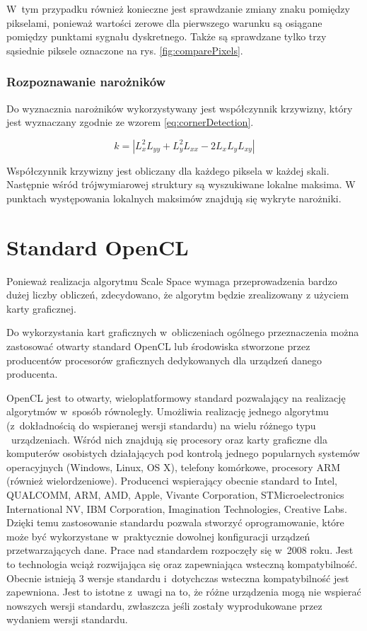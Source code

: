 W~tym przypadku również konieczne jest sprawdzanie zmiany znaku pomiędzy pikselami, ponieważ wartości zerowe dla pierwszego warunku są osiągane pomiędzy punktami sygnału dyskretnego. Także są sprawdzane tylko trzy sąsiednie piksele oznaczone na rys. \ref{fig:comparePixels}.

\subsubsection{Rozpoznawanie narożników}
\label{subsubsec:rozpoznawanieNaroznikow}

Do wyznacznia narożników wykorzystywany jest współczynnik krzywizny, który jest wyznaczany zgodnie ze wzorem \ref{eq:cornerDetection}.

\begin{equation}
\label{eq:cornerDetection}
k = |L_x^2L_{yy}  + L_y^2L_{xx} - 2L_xL_yL_{xy}|
\end{equation}

Współczynnik krzywizny jest obliczany dla każdego piksela w każdej skali. Następnie wśród trójwymiarowej struktury są wyszukiwane lokalne maksima. W punktach występowania lokalnych maksimów znajdują się wykryte narożniki.


\section{Standard OpenCL}
\label{sec:OpenCL}

Ponieważ realizacja algorytmu Scale Space wymaga przeprowadzenia bardzo dużej liczby obliczeń, zdecydowano, że algorytm będzie zrealizowany z użyciem karty graficznej.

Do wykorzystania kart graficznych w~obliczeniach ogólnego przeznaczenia można zastosować otwarty standard OpenCL lub środowiska stworzone przez producentów procesorów graficznych dedykowanych dla urządzeń danego producenta.

OpenCL jest to otwarty, wieloplatformowy standard pozwalający na realizację algorytmów w~sposób równoległy. Umożliwia realizację jednego algorytmu (z~dokładnością do wspieranej wersji standardu) na wielu różnego typu ~urządzeniach. Wśród nich znajdują się procesory oraz karty graficzne dla komputerów osobistych działających
 pod kontrolą jednego popularnych systemów operacyjnych (Windows, Linux, OS X), telefony komórkowe, procesory ARM (również wielordzeniowe). Producenci wspierający obecnie standard to Intel,
QUALCOMM,
ARM,
AMD,
Apple,
Vivante Corporation,
STMicroelectronics International NV,
IBM Corporation,
Imagination Technologies,
Creative Labs.
Dzięki temu zastosowanie standardu pozwala stworzyć oprogramowanie, które może być wykorzystane w~praktycznie dowolnej konfiguracji urządzeń przetwarzających dane. Prace nad standardem rozpoczęły się w~2008 roku. Jest to technologia wciąż rozwijająca się oraz zapewniająca wsteczną kompatybilność. Obecnie istnieją 3 wersje standardu i~dotychczas wsteczna kompatybilność jest zapewniona. Jest to istotne z~uwagi na to, że różne urządzenia mogą nie wspierać nowszych wersji standardu, zwłaszcza jeśli zostały wyprodukowane przez wydaniem wersji standardu.

